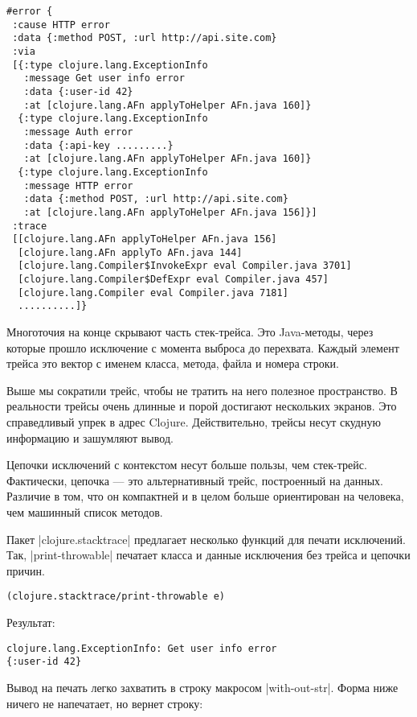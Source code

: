 \begin{verbatim}
#error {
 :cause HTTP error
 :data {:method POST, :url http://api.site.com}
 :via
 [{:type clojure.lang.ExceptionInfo
   :message Get user info error
   :data {:user-id 42}
   :at [clojure.lang.AFn applyToHelper AFn.java 160]}
  {:type clojure.lang.ExceptionInfo
   :message Auth error
   :data {:api-key .........}
   :at [clojure.lang.AFn applyToHelper AFn.java 160]}
  {:type clojure.lang.ExceptionInfo
   :message HTTP error
   :data {:method POST, :url http://api.site.com}
   :at [clojure.lang.AFn applyToHelper AFn.java 156]}]
 :trace
 [[clojure.lang.AFn applyToHelper AFn.java 156]
  [clojure.lang.AFn applyTo AFn.java 144]
  [clojure.lang.Compiler$InvokeExpr eval Compiler.java 3701]
  [clojure.lang.Compiler$DefExpr eval Compiler.java 457]
  [clojure.lang.Compiler eval Compiler.java 7181]
  ..........]}
\end{verbatim}

Многоточия на конце скрывают часть стек-трейса. Это Java-методы, через которые
прошло исключение с момента выброса до перехвата. Каждый элемент трейса это
вектор с именем класса, метода, файла и номера строки.

Выше мы сократили трейс, чтобы не тратить на него полезное пространство. В
реальности трейсы очень длинные и порой достигают нескольких экранов. Это
справедливый упрек в адрес Clojure. Действительно, трейсы несут скудную
информацию и зашумляют вывод.

Цепочки исключений с контекстом несут больше пользы, чем стек-трейс. Фактически,
цепочка — это альтернативный трейс, построенный на данных. Различие в том, что
он компактней и в целом больше ориентирован на человека, чем машинный список
методов.

Пакет \spverb|clojure.stacktrace| предлагает несколько функций для печати
исключений. Так, \spverb|print-throwable| печатает класса и данные исключения без
трейса и цепочки причин.

\begin{verbatim}
(clojure.stacktrace/print-throwable e)
\end{verbatim}

Результат:

\begin{verbatim}
clojure.lang.ExceptionInfo: Get user info error
{:user-id 42}
\end{verbatim}

Вывод на печать легко захватить в строку макросом \spverb|with-out-str|. Форма ниже
ничего не напечатает, но вернет строку:

